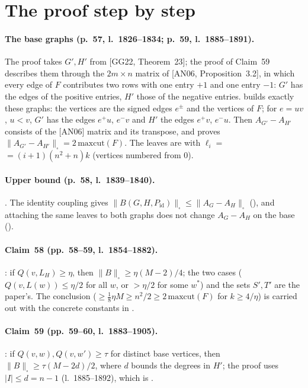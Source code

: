 \section{The proof step by step}

\paragraph{The base graphs (p.~57, l.~1826--1834; p.~59, l.~1885--1891).} The proof takes $G',H'$ from
[GG22, Theorem~23]; the proof of Claim~59 describes them through the $2m\times n$ matrix of [AN06,
Proposition~3.2], in which every edge of $F$ contributes two rows with one entry $+1$ and one entry $-1$: $G'$ has
the edges of the positive entries, $H'$ those of the negative entries.  builds exactly
these graphs: the vertices are the signed edges $e^\pm$ and the vertices of $F$; for $e=uv$, $u<v$, $G'$ has the
edges $e^+u$, $e^-v$ and $H'$ the edges $e^+v$, $e^-u$. Then $A_{G'}-A_{H'}$ consists of the [AN06] matrix and its
transpose, and  proves $\|A_{G'}-A_{H'}\|_\square=2\,\mathrm{maxcut}(F)$. The leaves
are  with $\ell_i=$  $=(i+1)(n^2+n)k$ (vertices numbered from $0$).

\paragraph{Upper bound (p.~58, l.~1839--1840).} . The identity coupling gives
$\|B(G,H,P_{\mathrm{id}})\|_\square\le\|A_G-A_H\|_\square$ (), and attaching the same
leaves to both graphs does not change $A_G-A_H$ on the base ().

\paragraph{Claim~58 (pp.~58--59, l.~1854--1882).} : if $Q(v,L_H)\ge\eta$, then
$\|B\|_\square\ge\eta(M-2)/4$; the two cases ($Q(v,L(w))\le\eta/2$ for all $w$, or $>\eta/2$ for some $w^*$) and
the sets $S',T'$ are the paper's. The conclusion ($\ge\frac18\eta M\ge n^2/2\ge2\,\mathrm{maxcut}(F)$ for
$k\ge4/\eta$) is carried out with the concrete constants in .

\paragraph{Claim~59 (pp.~59--60, l.~1883--1905).} : if $Q(v,w),Q(v,w')\ge\tau$ for distinct base
vertices, then $\|B\|_\square\ge\tau(M-2d)/2$, where $d$ bounds the degrees in $H'$; the proof uses
$|I|\le d=n-1$ (l.~1885--1892), which is .

